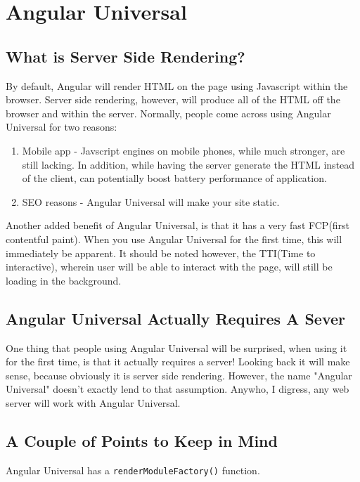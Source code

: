 \chapter{ Angular Universal }

\section{What is Server Side Rendering?}
\begin{quote}
\end{quote}

By default, Angular will render HTML on the page using Javascript within the browser. Server side rendering, however, will produce all of the HTML off the browser and within the server. Normally, people come across using Angular Universal for two reasons: 
\begin{enumerate}
  \item Mobile app - Javscript engines on mobile phones, while much stronger, are still lacking. In addition, while having the server generate the HTML instead of the client, can potentially boost battery performance of application.
  \item SEO reasons - Angular Universal will make your site static. 
\end{enumerate}

Another added benefit of Angular Universal, is that it has a very fast FCP(first contentful paint). When you use Angular Universal for the first time, this will immediately be apparent. It should be noted however, the TTI(Time to interactive), wherein user will be able to interact with the page, will still be loading in the background. 

\section{Angular Universal Actually Requires A Sever}
One thing that people using Angular Universal will be surprised, when using it for the first time, is that it actually requires a server! Looking back it will make sense, because obviously it is server side rendering. However, the name "Angular Universal" doesn't exactly lend to that assumption. Anywho, I digress, any web server will work with Angular Universal. 

\section{A Couple of Points to Keep in Mind}
Angular Universal has a \lstinline{renderModuleFactory()} function. 

